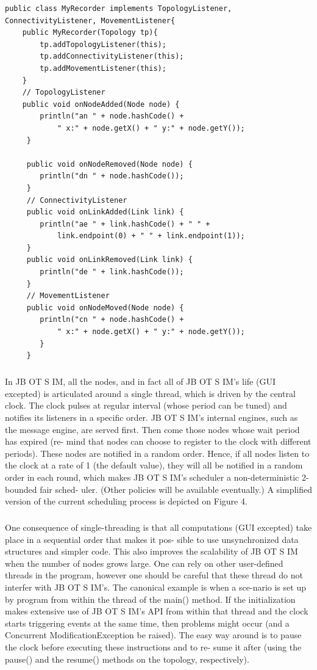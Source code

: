\begin{lstlisting}
public class MyRecorder implements TopologyListener, ConnectivityListener, MovementListener{
	public MyRecorder(Topology tp){
		tp.addTopologyListener(this);
		tp.addConnectivityListener(this);
		tp.addMovementListener(this);
	}
	// TopologyListener
	public void onNodeAdded(Node node) {
	 	println("an " + node.hashCode() +
	 		" x:" + node.getX() + " y:" + node.getY());
	 }
	 
	 public void onNodeRemoved(Node node) {
	 	println("dn " + node.hashCode());
	 }
	 // ConnectivityListener
	 public void onLinkAdded(Link link) {
	 	println("ae " + link.hashCode() + " " +
	 		link.endpoint(0) + " " + link.endpoint(1));
	 }
	 public void onLinkRemoved(Link link) {
	 	println("de " + link.hashCode());
	 }
	 // MovementListener
	 public void onNodeMoved(Node node) {
	 	println("cn " + node.hashCode() +
	 		" x:" + node.getX() + " y:" + node.getY());
	 	}
	 }
\end{lstlisting}
\subparagraph{}In JB OT S IM, all the nodes, and in fact all of JB OT S IM’s life (GUI excepted) is articulated around a single thread, which is driven by the central clock. The clock pulses at regular interval (whose period can be tuned) and notifies its listeners in a specific order. JB OT S IM’s internal engines, such as the message engine, are served first. Then come those nodes whose wait period has expired (re- mind that nodes can choose to register to the clock with different periods). These nodes are notified in a random order. Hence, if all nodes listen to the clock at a rate of 1 (the default value), they will all be notified in a random order in each round, which makes JB OT S IM’s scheduler a non-deterministic 2-bounded fair sched- uler. (Other policies will be available eventually.) A simplified version of the current scheduling process is depicted on Figure 4.
\subparagraph{}One consequence of single-threading is that all computations (GUI excepted) take place in a sequential order that makes it pos- sible to use unsynchronized data structures and simpler code. This also improves the scalability of JB OT S IM when the number of nodes grows large. One can rely on other user-defined threads in the program, however one should be careful that these thread do not interfer with JB OT S IM’s. The canonical example is when a sce-nario is set up by program from within the thread of the main() method. If the initialization makes extensive use of JB OT S IM’s API from within that thread and the clock starts triggering events at the same time, then problems might occur (and a Concurrent ModificationException be raised). The easy way around is to pause the clock before executing these instructions and to re- sume it after (using the pause() and the resume() methods on the topology, respectively).
